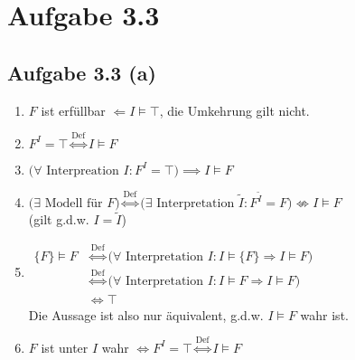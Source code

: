 \documentclass[12pt,a4paper]{article}
\begin{document}
\section*{Aufgabe 3.3}
\subsection*{Aufgabe 3.3 (a)}
\begin{enumerate}[label=(\arabic*)]
\item $F$ ist erfüllbar $\Leftarrow I\models\top$, die Umkehrung gilt nicht.
\item $F^I=\top\stackrel{\text{Def}}{\Longleftrightarrow} I\models F$
\item $\big(\forall\text{ Interpreation }I:F^I=\top\big)\implies I\models F$
\item $\Big(\exists\text{ Modell für }F \Big)
\stackrel{\text{Def}}{\Longleftrightarrow}
\Big(\exists\text{ Interpretation }\tilde{I}:F^{\tilde{I}}=F\big)\not\Longleftrightarrow I\models F$\\
(gilt g.d.w. $I=\tilde{I}$)
\item $\begin{aligned}
\lbrace F\rbrace\models F
&\stackrel{\text{Def}}{\Longleftrightarrow}
\big(\forall\text{ Interpretation }I:I\models\lbrace F\rbrace\Rightarrow I\models F\big)\\
&\stackrel{\text{Def}}{\Longleftrightarrow}
\big(\forall\text{ Interpretation }I:I\models F\Rightarrow I\models F\big)\\
&\Longleftrightarrow\top
\end{aligned}$\\
Die Aussage ist also nur äquivalent, g.d.w. $I\models F$ wahr ist.
\item $F$ ist unter $I$ wahr $\Longleftrightarrow F^I=\top\stackrel{\text{Def}}{\Longleftrightarrow} I\models F$
\end{enumerate}
\end{document}
